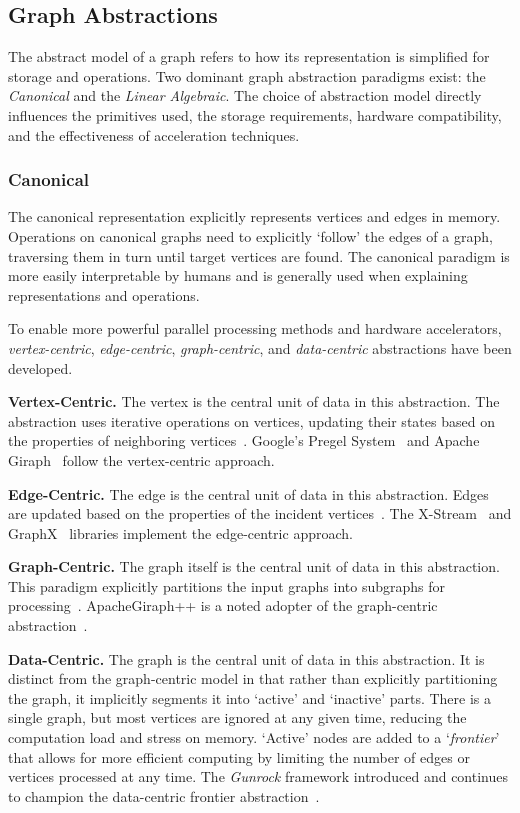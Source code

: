 

\subsection{Graph Abstractions}
The abstract model of a graph refers to how its representation is simplified for storage and operations. 
Two dominant graph abstraction paradigms exist: the \textit{Canonical} and the \textit{Linear Algebraic}.
The choice of abstraction model directly influences the primitives used, the storage requirements, hardware compatibility, and the effectiveness of acceleration techniques. 

\subsubsection{Canonical}
The canonical representation explicitly represents vertices and edges in memory.
Operations on canonical graphs need to explicitly `follow' the edges of a graph, traversing them in turn until target vertices are found. 
The canonical paradigm is more easily interpretable by humans and is generally used when explaining representations and operations. 

To enable more powerful parallel processing methods and hardware accelerators, \textit{vertex-centric}, \textit{edge-centric}, \textit{graph-centric}, and \textit{data-centric} abstractions have been developed.

\textbf{Vertex-Centric.} 
The vertex is the central unit of data in this abstraction. 
The abstraction uses iterative operations on vertices, updating their states based on the properties of neighboring vertices~\cite{Mccune2015}.
Google's Pregel System~\cite{Malewicz2010} and Apache Giraph~\cite{Sakr2016} follow the vertex-centric approach.

\textbf{Edge-Centric.}
The edge is the central unit of data in this abstraction.  
Edges are updated based on the properties of the incident vertices~\cite{Liu2019}.
The X-Stream~\cite{Roy2013} and GraphX~\cite{Gonzalez2014} libraries implement the edge-centric approach. 

\textbf{Graph-Centric.} 
The graph itself is the central unit of data in this abstraction. 
This paradigm explicitly partitions the input graphs into subgraphs for processing~\cite{Coimbra2021}.
ApacheGiraph++ is a noted adopter of the graph-centric abstraction~\cite{Kalavri2017}.

\textbf{Data-Centric.} 
The graph is the central unit of data in this abstraction.   
It is distinct from the graph-centric model in that rather than explicitly partitioning the graph, it implicitly segments it into `active' and `inactive' parts.
There is a single graph, but most vertices are ignored at any given time, reducing the computation load and stress on memory. 
`Active' nodes are added to a `\textit{frontier}' that allows for more efficient computing by limiting the number of edges or vertices processed at any time. 
The \textit{Gunrock} framework introduced and continues to champion the data-centric frontier abstraction~\cite{Wang2016}.


